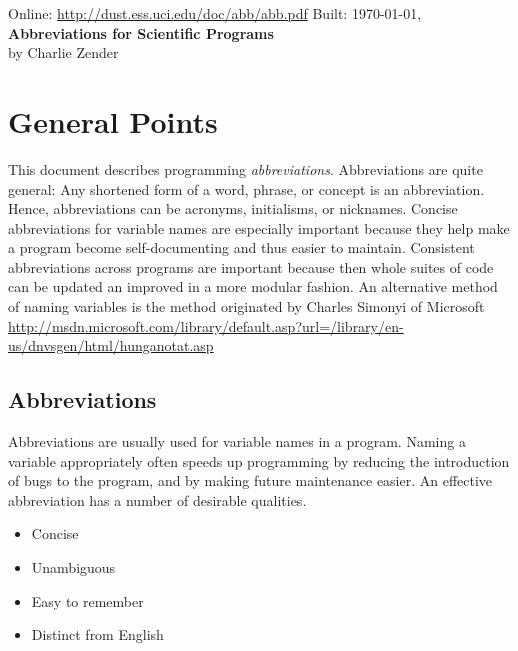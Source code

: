 \documentclass[12pt,twoside]{article}
\begin{document}
\begin{center}
Online: \url{http://dust.ess.uci.edu/doc/abb/abb.pdf} \hfill Built: \shortdate\today, \xxivtime\\
\bigskip
{\Large \textbf{Abbreviations for Scientific Programs}}\\
\bigskip
by Charlie Zender\\
\end{center}

\setcounter{page}{1}
\pagestyle{headings}
\thispagestyle{empty}
\tableofcontents
{}
\setcounter{page}{1}
\thispagestyle{empty}

\section{General Points}

This document describes programming \textit{abbreviations}.
Abbreviations are quite general: Any shortened
form of a word, phrase, or concept is an abbreviation.
Hence, abbreviations can be acronyms, initialisms, or nicknames.
Concise abbreviations for variable names are especially important
because they help make a program become self-documenting and thus
easier to maintain.
Consistent abbreviations across programs are important because then
whole suites of code can be updated an improved in a more modular
fashion. 
An alternative method of naming variables is the  method originated by Charles Simonyi of Microsoft
\url{http://msdn.microsoft.com/library/default.asp?url=/library/en-us/dnvsgen/html/hunganotat.asp}

\subsection{Abbreviations}
Abbreviations are usually used for variable names in a program.
Naming a variable appropriately often speeds up programming by
reducing the introduction of bugs to the program, and by making future 
maintenance easier.
An effective abbreviation has a number of desirable qualities.
\begin{itemize}
\item Concise
\item Unambiguous
\item Easy to remember
\item Distinct from English
\end{itemize}
\end{document}
